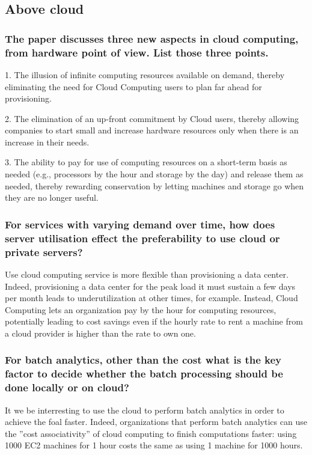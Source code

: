 

\subsection{Above cloud}

\subsubsection*{The paper discusses three new aspects in cloud computing,
from hardware point of view. List those three points.}

1. The illusion of infinite computing resources available on demand,
thereby eliminating the need for Cloud Computing users to plan far
ahead for provisioning.

2. The elimination of an up-front commitment by Cloud users, thereby
allowing companies to start small and increase hardware resources only
when there is an increase in their needs.

3. The ability to pay for use of computing resources on a short-term
basis as needed (e.g., processors by the hour and storage by the day)
and release them as needed, thereby rewarding conservation by letting
machines and storage go when they are no longer useful.

\subsubsection*{For services with varying demand over time, how does
server utilisation effect the preferability to use cloud or private
servers?}

Use cloud computing service is more flexible than provisioning a data
center. Indeed, provisioning a data center for the peak load it must
sustain a few days per month leads to underutilization at other times,
for example. Instead, Cloud Computing lets an organization pay by the
hour for computing resources, potentially leading to cost savings even
if the hourly rate to rent a machine from a cloud provider is higher
than the rate to own one.

\subsubsection*{For batch analytics, other than the cost what is the key
factor to decide whether the batch processing should be done locally or
on cloud?}

It we be interresting to use the cloud to perform batch analytics in
order to achieve the foal faster. Indeed, organizations that perform
batch analytics can use the ”cost associativity” of cloud computing
to finish computations faster: using 1000 EC2 machines for 1 hour costs
the same as using 1 machine for 1000 hours.


